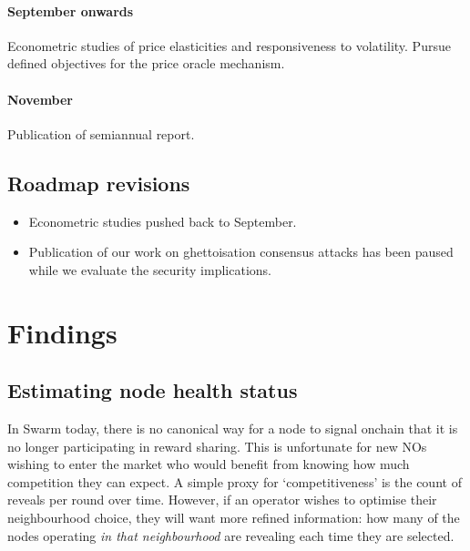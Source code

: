 \paragraph{September onwards}
%
Econometric studies of price elasticities and responsiveness to volatility.
%
Pursue defined objectives for the price oracle mechanism.

\paragraph{November}
%
Publication of semiannual report.


\subsection*{Roadmap revisions}

\begin{itemize}
  \item Econometric studies pushed back to September.
  \item Publication of our work on ghettoisation consensus attacks has been paused while we evaluate the security implications.
\end{itemize}



\section*{Findings}

\subsection*{Estimating node health status}

In Swarm today, there is no canonical way for a node to signal onchain that it is no longer participating in reward sharing.
%
This is unfortunate for new NOs wishing to enter the market who would benefit from knowing how much competition they can expect.
%
A simple proxy for `competitiveness' is the count of reveals per round over time. 
%
However, if an operator wishes to optimise their neighbourhood choice, they will want more refined information: how many of the nodes operating \emph{in that neighbourhood} are revealing each time they are selected.

